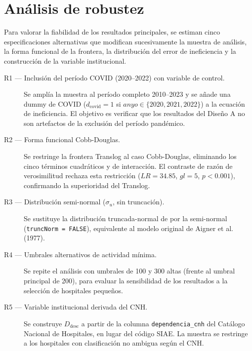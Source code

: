 
\section{Análisis de robustez}
\label{sec:robustez}

Para valorar la fiabilidad de los resultados principales, se estiman cinco especificaciones alternativas que modifican sucesivamente la muestra de análisis, la forma funcional de la frontera, la distribución del error de ineficiencia y la construcción de la variable institucional.

\begin{description}
  \item[R1 — Inclusión del período COVID (2020–2022) con variable de control.]
    Se amplía la muestra al período completo 2010–2023 y se añade una dummy de COVID ($d_{\text{covid}} = 1$ si $\textit{anyo} \in \{2020, 2021, 2022\}$) a la ecuación de ineficiencia. El objetivo es verificar que los resultados del Diseño A no son artefactos de la exclusión del período pandémico.
  \item[R2 — Forma funcional Cobb-Douglas.]
    Se restringe la frontera Translog al caso Cobb-Douglas, eliminando los cinco términos cuadráticos y de interacción. El contraste de razón de verosimilitud rechaza esta restricción ($LR = 34.85$, $gl = 5$, $p < 0.001$), confirmando la superioridad del Translog.
  \item[R3 — Distribución semi-normal ($\sigma_u$, sin truncación).]
    Se sustituye la distribución truncada-normal de \citet{battese1995model} por la semi-normal (\texttt{truncNorm = FALSE}), equivalente al modelo original de Aigner et al. (1977).
  \item[R4 — Umbrales alternativos de actividad mínima.]
    Se repite el análisis con umbrales de 100 y 300 altas (frente al umbral principal de 200), para evaluar la sensibilidad de los resultados a la selección de hospitales pequeños.
  \item[R5 — Variable institucional derivada del CNH.]
    Se construye \(D_{\text{desc}}\) a partir de la columna \texttt{dependencia\_cnh} del Catálogo Nacional de Hospitales, en lugar del código SIAE. La muestra se restringe a los hospitales con clasificación no ambigua según el CNH.
\end{description}

